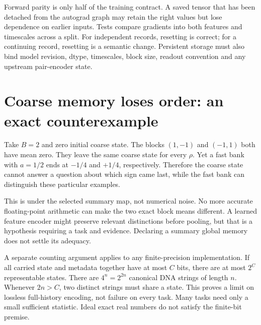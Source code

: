
Forward parity is only half of the training contract. A saved tensor that
has been detached from the autograd graph may retain the right values but
lose dependence on earlier inputs. Tests compare gradients into both
features and timescales across a split. For independent records, resetting
is correct; for a continuing record, resetting is a semantic change.
Persistent storage must also bind model revision, dtype, timescales, block
size, readout convention and any upstream pair-encoder state.

\section{Coarse memory loses order: an exact counterexample}

Take $B=2$ and zero initial coarse state. The blocks $(1,-1)$ and $(-1,1)$
both have mean zero. They leave the same coarse state for every $\rho$.
Yet a fast bank with $a=1/2$ ends at $-1/4$ and $+1/4$, respectively.
Therefore the coarse state cannot answer a question about which sign came
last, while the fast bank can distinguish these particular examples.


This is  under the selected summary map, not numerical noise.
No more accurate floating-point arithmetic can make the two exact block
means different. A learned feature encoder might preserve relevant
distinctions before pooling, but that is a hypothesis requiring a task and
evidence. Declaring a summary global memory does not settle its adequacy.

A separate counting argument applies to any finite-precision implementation.
If all carried state and metadata together have at most $C$ bits, there are
at most $2^C$ representable states. There are $4^n=2^{2n}$ canonical DNA
strings of length $n$. Whenever $2n>C$, two distinct strings must share a
state. This proves a limit on lossless full-history encoding, not failure
on every task. Many tasks need only a small sufficient statistic.
Ideal exact real numbers do not satisfy the finite-bit premise.

